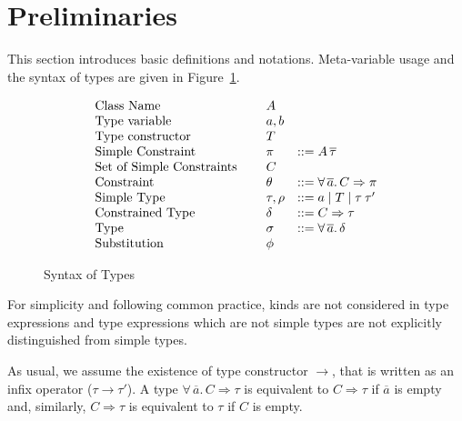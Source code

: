 \section{Preliminaries}\label{prelimirares}

This section introduces basic definitions and notations. Meta-variable
usage and the syntax of types are given in Figure~\ref{fig:meta}.  

\begin{figure} 
\begin{mdframed}
\[ \begin{array}[c]{llll}
\textrm{Class Name}         &\hspace{.1cm} & A         & \\
\textrm{Type variable}      &         & a,b & \\
\textrm{Type constructor}   &         & T              & \\
\textrm{Simple Constraint}  &         & \pi            & ::= A\,\overline{\tau}\\
\textrm{Set of Simple Constraints} &  & C            & \\
\textrm{Constraint}         &         & \theta         & ::= \forall\,\overline{a}.\,C\Rightarrow\pi\\
\textrm{Simple Type}        &         & \tau,\rho     & ::= a \mid T \mid \tau\:\tau' \\
\textrm{Constrained Type}   &         & \delta & ::= C\Rightarrow \tau\\

\textrm{Type}               &         & \sigma         & ::= \forall\,\overline{a}.\,\delta \\
\textrm{Substitution}    &         & \phi         & \\
\end{array} \]
\end{mdframed} \vspace{-.2cm}
\caption{Syntax of Types}
\label{fig:meta}
\end{figure}

For simplicity and following common practice, kinds are not considered
in type expressions and type expressions which are not simple types
are not explicitly distinguished from simple types. 

As usual, we assume the existence of type constructor $\to$, that is
written as an infix operator ($\tau \to \tau'$). A type
$\forall\,\overline{a}.\,C\Rightarrow \tau$ is equivalent to
$C\Rightarrow \tau$ if $\overline{a}$ is empty and, similarly,
$C\Rightarrow \tau$ is equivalent to $\tau$ if $C$ is empty.

